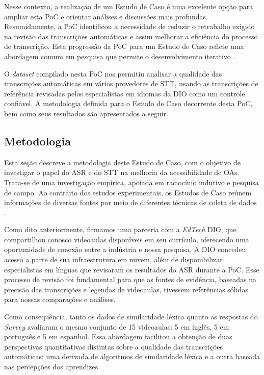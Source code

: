 Nesse contexto, a realização de um Estudo de Caso é uma excelente opção para ampliar esta PoC e orientar análises e discussões mais profundas. Resumidamente, a PoC identificou a necessidade de reduzir o retrabalho exigido na revisão das transcrições automáticas e assim melhorar a eficiência do processo de transcrição. Esta progressão da PoC para um Estudo de Caso reflete uma abordagem comum em pesquisa que permite o desenvolvimento iterativo \cite{Runeson2009}. 

O \textit{dataset} compilado nesta PoC nos permitiu analisar a qualidade das transcrições automáticas em vários provedores de STT, usando as transcrições de referência revisadas pelos especialistas em idiomas da DIO como um controle confiável. A metodologia definida para o Estudo de Caso decorrente desta PoC, bem como seus resultados são apresentados a seguir.

\subsection{Metodologia}

Esta seção descreve a metodologia deste Estudo de Caso, com o objetivo de investigar o papel do ASR e do STT na melhoria da acessibilidade de OAs. Trata-se de uma investigação empírica, apoiada em raciocínio indutivo e pesquisa de campo. Ao contrário dos estudos experimentais, os Estudos de Caso reúnem informações de diversas fontes por meio de diferentes técnicas de coleta de dados \cite{Sommerville2015}.

Como dito anteriormente, firmamos uma parceria com a \textit{EdTech} DIO, que compartilhou conosco videoaulas disponíveis em seu currículo, oferecendo uma oportunidade de conexão entre a indústria e nossa pesquisa. A DIO concedeu acesso a parte de sua infraestrutura em nuvem, além de disponibilizar especialistas em línguas que revisaram os resultados do ASR durante a PoC. Esse processo de revisão foi fundamental para que as fontes de evidência, baseadas na precisão das transcrições e legendas de videoaulas, tivessem referências sólidas para nossas comparações e análises.

Como consequência, tanto os dados de similaridade léxica quanto as respostas do \textit{Survey} avaliaram o mesmo conjunto de 15 videoaulas: 5 em inglês, 5 em português e 5 em espanhol. Essa abordagem facilitou a obtenção de duas perspectivas quantitativas distintas sobre a qualidade das transcrições automáticas: uma derivada de algoritmos de similaridade léxica e a outra baseada nas percepções dos aprendizes.

